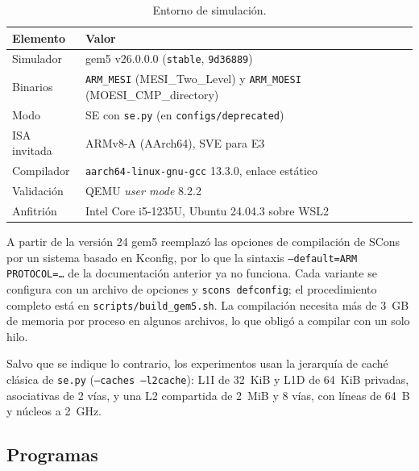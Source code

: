 \documentclass[journal]{IEEEtran}
\begin{document}
\begin{table}[h]
\centering
\caption{Entorno de simulación.}
\label{tab:entorno}
\footnotesize
\setlength{\tabcolsep}{3pt}
\begin{tabular}{|l|p{5cm}|}
\hline
\textbf{Elemento} & \textbf{Valor} \\ \hline
Simulador        & gem5 v26.0.0.0 (\texttt{stable}, \texttt{9d36889}) \\ \hline
Binarios         & \texttt{ARM\_MESI} (MESI\_Two\_Level) y
                   \texttt{ARM\_MOESI} (MOESI\_CMP\_directory) \\ \hline
Modo             & SE con \texttt{se.py} (en \texttt{configs/deprecated}) \\ \hline
ISA invitada     & ARMv8-A (AArch64), SVE para E3 \\ \hline
Compilador       & \texttt{aarch64-linux-gnu-gcc} 13.3.0, enlace estático \\ \hline
Validación       & QEMU \emph{user mode} 8.2.2 \\ \hline
Anfitrión        & Intel Core i5-1235U, Ubuntu 24.04.3 sobre WSL2 \\ \hline
\end{tabular}
\end{table}

A partir de la versión 24 gem5 reemplazó las opciones de compilación de
SCons por un sistema basado en Kconfig, por lo que la sintaxis
\texttt{--default=ARM PROTOCOL=\dots} de la documentación anterior ya no
funciona. Cada variante se configura con un archivo de opciones y
\texttt{scons defconfig}; el procedimiento completo está en
\texttt{scripts/build\_gem5.sh}. La compilación necesita más de
\SI{3}{GB} de memoria por proceso en algunos archivos, lo que obligó a
compilar con un solo hilo.

Salvo que se indique lo contrario, los experimentos usan la jerarquía
de caché clásica de \texttt{se.py} (\texttt{--caches --l2cache}): L1I de
\SI{32}{KiB} y L1D de \SI{64}{KiB} privadas, asociativas de 2 vías, y
una L2 compartida de \SI{2}{MiB} y 8 vías, con líneas de \SI{64}{B} y
núcleos a \SI{2}{GHz}.

\subsection{Programas}
\end{document}
